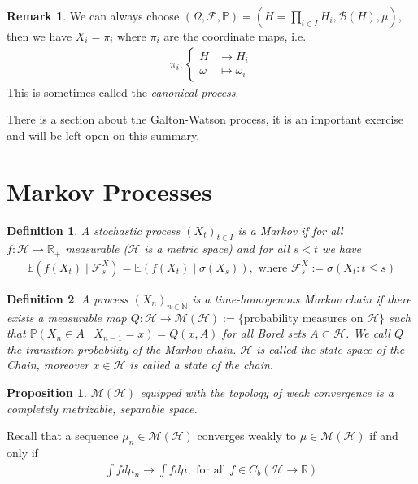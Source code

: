 \documentclass[11pt,a4paper, final]{article}
\newtheorem{prop}{Proposition}[section]
\newtheorem{defn}{Definition}[section]
\theoremstyle{definition}
\newtheorem{rem}{Remark}[section]
\begin{document}
\begin{rem} We can always choose $( \Omega, \mathcal{F}, \mathbb{P}) = ( H = \prod_{i \in I} H_i, \mathcal{B}(H), \mu)$, then we have $X_i = \pi_i$ where $\pi_i$ are the coordinate maps, i.e.
\begin{align*}
\pi_i : \begin{cases} H & \longrightarrow H_i \\ \omega & \longmapsto \omega_i  \end{cases}
\end{align*}
This is sometimes called the \textit{canonical process}. 
\end{rem}
There is a section about the Galton-Watson process, it is an important exercise and will be left open on this summary. 
\newpage
\section{Markov Processes}
\begin{defn}
A stochastic process $(X_t)_{t \in I}$ is a Markov if for all \\ $f: \mathcal{H} \to \mathbb{R}_+$ measurable ($\mathcal{H}$ is a metric space) and for all $s <t$ we have 
\begin{align*}
\mathbb{E}(f(X_t) \mid \mathcal{F}_s^X ) = \mathbb{E}(f (X_t) \mid \sigma (X_s)), \text{ where } \mathcal{F}_s^X := \sigma ( X_t : t \leq s )  
\end{align*}
\end{defn}
\begin{defn} A process $(X_n)_{n \in \mathbb{N}}$ is a time-homogenous Markov chain if there exists a measurable map $Q: \mathcal{H} \to \mathcal{M}( \mathcal{H}):= \lbrace \text{probability measures on } \mathcal{H} \rbrace$ such that $\mathbb{P}(X_n \in A \mid X_{n-1} = x ) = Q(x,A)$ for all Borel sets $A \subset \mathcal{H}$. We call $Q$ the transition probability of the Markov chain. $\mathcal{H}$ is called the state space of the Chain, moreover $x \in \mathcal{H}$ is called a state of the chain. 
\end{defn}
\begin{prop} $\mathcal{M}( \mathcal{H})$ equipped with the topology of weak convergence is a completely metrizable, separable space. 
\end{prop}
\noindent Recall that a sequence $\mu_n \in \mathcal{M}( \mathcal{H})$ converges weakly to $\mu \in \mathcal{M}( \mathcal{H})$ if and only if 
\begin{align*}
 \int f d \mu_n \to \int f d \mu, \text{ for all } f \in C_b ( \mathcal{H} \to \mathbb{R})
\end{align*}
\end{document}
